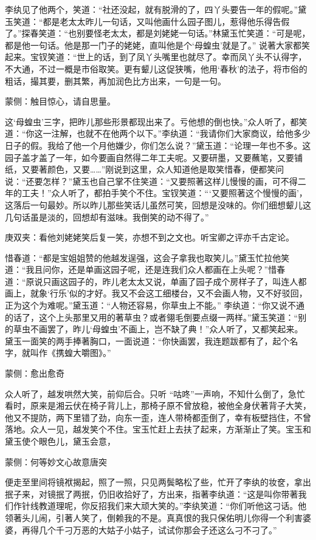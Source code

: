 \begin{parag}
    李纨见了他两个，笑道：“社还没起，就有脱滑的了，四丫头要告一年的假呢。”黛玉笑道：“都是老太太昨儿一句话，又叫他画什么园子图儿，惹得他乐得告假了。”探春笑道：“也别要怪老太太，都是刘姥姥一句话。”林黛玉忙笑道：“可是呢，都是他一句话。他是那一门子的姥姥，直叫他是个‘母蝗虫’就是了。” 说著大家都笑起来。宝钗笑道：“世上的话，到了凤丫头嘴里也就尽了。幸而凤丫头不认得字，不大通，不过一概是市俗取笑。更有颦儿这促狭嘴，他用‘春秋’的法子，将市俗的粗话，撮其要，删其繁，再加润色比方出来，一句是一句。\begin{note}蒙侧：触目惊心，请自思量。\end{note}这‘母蝗虫’三字，把昨儿那些形景都现出来了。亏他想的倒也快。”众人听了，都笑道：“你这一注解，也就不在他两个以下。”李纨道：“我请你们大家商议，给他多少日子的假。我给了他一个月他嫌少，你们怎么说？”黛玉道：“论理一年也不多。这园子盖才盖了一年，如今要画自然得二年工夫呢。又要研墨，又要蘸笔，又要铺纸，又要著颜色，又要……”刚说到这里，众人知道他是取笑惜春，便都笑问说：“还要怎样？”黛玉也自己掌不住笑道：“又要照著这样儿慢慢的画，可不得二年的工夫！”众人听了，都拍手笑个不住。宝钗笑道：“‘又要照著这个慢慢的画’，这落后一句最妙。所以昨儿那些笑话儿虽然可笑，回想是没味的。你们细想颦儿这几句话虽是淡的，回想却有滋味。我倒笑的动不得了。”\begin{note}庚双夹：看他刘姥姥笑后复一笑，亦想不到之文也。听宝卿之评亦千古定论。\end{note}惜春道：“都是宝姐姐赞的他越发逞强，这会子拿我也取笑儿。”黛玉忙拉他笑道：“我且问你，还是单画这园子呢，还是连我们众人都画在上头呢？”惜春道：“原说只画这园子的，昨儿老太太又说，单画了园子成个房样子了，叫连人都画上，就象‘行乐’似的才好。我又不会这工细楼台，又不会画人物，又不好驳回，正为这个为难呢。”黛玉道：“人物还容易，你草虫上不能。” 李纨道：“你又说不通的话了，这个上头那里又用的著草虫？或者翎毛倒要点缀一两样。”黛玉笑道：“别的草虫不画罢了，昨儿‘母蝗虫’不画上，岂不缺了典！”众人听了，又都笑起来。黛玉一面笑的两手捧著胸口，一面说道：“你快画罢，我连题跋都有了，起个名字，就叫作《携蝗大嚼图》。”\begin{note}蒙侧：愈出愈奇\end{note}众人听了，越发哄然大笑，前仰后合。只听 “咕咚”一声响，不知什么倒了，急忙看时，原来是湘云伏在椅子背儿上，那椅子原不曾放稳，被他全身伏著背子大笑，他又不提防，两下里错了劲，向东一歪，连人带椅都歪倒了，幸有板壁挡住，不曾落地。众人一见，越发笑个不住。宝玉忙赶上去扶了起来，方渐渐止了笑。宝玉和黛玉使个眼色儿，黛玉会意，\begin{note}蒙侧：何等妙文心故意唐突\end{note}便走至里间将镜袱揭起，照了一照，只见两鬓略松了些，忙开了李纨的妆奁，拿出抿子来，对镜抿了两抿，仍旧收拾好了，方出来，指著李纨道：“这是叫你带著我们作针线教道理呢，你反招我们来大顽大笑的。”李纨笑道：“你们听他这刁话。他领著头儿闹，引著人笑了，倒赖我的不是。真真恨的我只保佑明儿你得一个利害婆婆，再得几个千刁万恶的大姑子小姑子，试试你那会子还这么刁不刁了。”
\end{parag}



